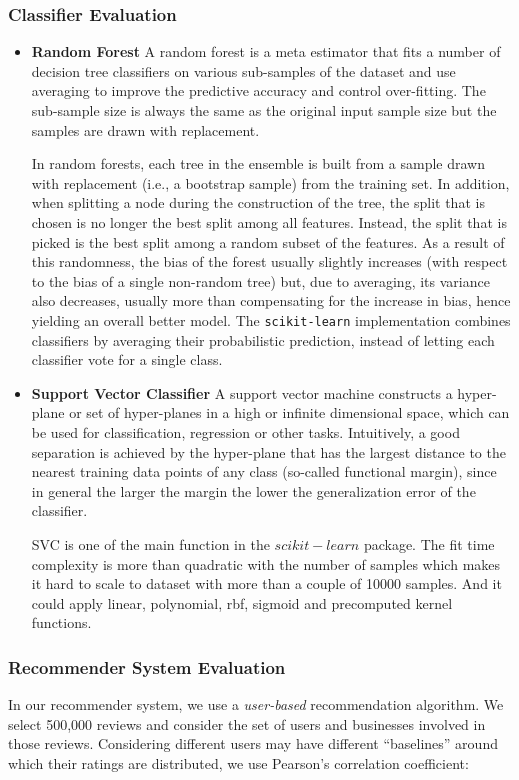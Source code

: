 \subsubsection{Classifier Evaluation}
\begin{itemize}
	\item \textbf{Random Forest}
	A random forest is a meta estimator that fits a number of decision tree classifiers on various sub-samples of the dataset and use averaging to improve the predictive accuracy and control over-fitting. The sub-sample size is always the same as the original input sample size but the samples are drawn with replacement.
	
	In random forests, each tree in the ensemble is built from a sample drawn with replacement (i.e., a bootstrap sample) from the training set. In addition, when splitting a node during the construction of the tree, the split that is chosen is no longer the best split among all features. Instead, the split that is picked is the best split among a random subset of the features. As a result of this randomness, the bias of the forest usually slightly increases (with respect to the bias of a single non-random tree) but, due to averaging, its variance also decreases, usually more than compensating for the increase in bias, hence yielding an overall better model.
	The \texttt{scikit-learn} implementation combines classifiers by averaging their probabilistic prediction, instead of letting each classifier vote for a single class.
	\item \textbf{Support Vector Classifier}
	A support vector machine constructs a hyper-plane or set of hyper-planes in a high or infinite dimensional space, which can be used for classification, regression or other tasks. Intuitively, a good separation is achieved by the hyper-plane that has the largest distance to the nearest training data points of any class (so-called functional margin), since in general the larger the margin the lower the generalization error of the classifier.
	
	SVC is one of the main function in the $ scikit-learn $ package. The fit time complexity is more than quadratic with the number of samples which makes it hard to scale to dataset with more than a couple of 10000 samples. And it could apply linear, polynomial, rbf, sigmoid and precomputed kernel functions.
	\end{itemize}
\subsubsection{Recommender System Evaluation}
In our recommender system, we use a \emph{user-based} recommendation algorithm. We select 500,000 reviews and consider the set of users and businesses involved in those reviews. Considering different users may have different ``baselines'' around which their ratings are distributed, we use Pearson's correlation coefficient:

